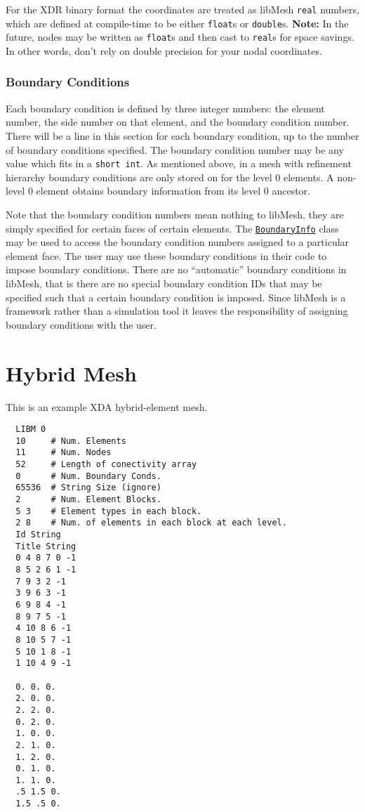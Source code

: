 \documentclass[12pt]{article}
\begin{document}
For the XDR binary format the coordinates are treated as libMesh \texttt{real} numbers, which are defined at compile-time to be either \texttt{float}s or \texttt{double}s.  \textbf{Note:} In the future, nodes may be written as \texttt{float}s and then cast to \texttt{real}s for space savings.  In other words, don't rely on double precision for your nodal coordinates.

\subsubsection{Boundary Conditions}
Each boundary condition is defined by three integer numbers:  the element number, the side number on that element, and the boundary condition number.  There will be a line in this section for each boundary condition, up to the number of boundary conditions specified.  The boundary condition number may be any value which fits in a \texttt{short int}. As mentioned above, in a mesh with refinement hierarchy boundary conditions are only stored on for the level 0 elements. A non-level 0 element obtains boundary information from its level 0 ancestor.

Note that the boundary condition numbers mean nothing to libMesh, they are simply specified for certain faces of certain elements.  The \href{http://libmesh.sourceforge.net/doxygen/classBoundaryInfo.html}{\texttt{BoundaryInfo}} class may be used to access the boundary condition numbers assigned to a particular element face.  The user may use these boundary conditions in their code to impose boundary conditions.  There are no ``automatic'' boundary conditions in libMesh, that is there are no special boundary condition IDs that may be specified such that a certain boundary condition is imposed.  Since libMesh is a framework rather than a simulation tool it leaves the responsibility of assigning boundary conditions with the user.

\clearpage
\appendix
\section{Hybrid Mesh}
This is an example XDA hybrid-element mesh.
\small
\begin{verbatim}
  LIBM 0
  10     # Num. Elements
  11     # Num. Nodes
  52     # Length of conectivity array
  0      # Num. Boundary Conds.
  65536  # String Size (ignore)
  2      # Num. Element Blocks.
  5 3    # Element types in each block.
  2 8    # Num. of elements in each block at each level.
  Id String
  Title String
  0 4 8 7 0 -1
  8 5 2 6 1 -1
  7 9 3 2 -1
  3 9 6 3 -1
  6 9 8 4 -1
  8 9 7 5 -1
  4 10 8 6 -1
  8 10 5 7 -1
  5 10 1 8 -1
  1 10 4 9 -1

  0. 0. 0.
  2. 0. 0.
  2. 2. 0.
  0. 2. 0.
  1. 0. 0.
  2. 1. 0.
  1. 2. 0.
  0. 1. 0.
  1. 1. 0.
  .5 1.5 0.
  1.5 .5 0.
\end{verbatim}
\normalsize
\end{document}
